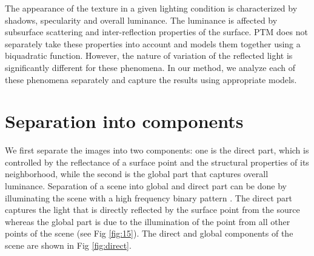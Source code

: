 The appearance of the texture in a given lighting condition is characterized by
shadows, specularity and overall luminance. The luminance is affected by
subsurface scattering and inter-reflection properties of the surface. PTM does
not separately take these properties into account and models them together using
a biquadratic function. However, the nature of variation of the reflected light
is significantly different for these phenomena.
In our method, we analyze each of these phenomena separately and capture the
results using appropriate models. 
\section{Separation into components}
We first separate the images into two components: one is the direct part, which is controlled by the reflectance of a
surface point and the structural properties of its neighborhood, while the
second is the global part that captures overall luminance. 
Separation of a scene into global and direct part can be done by illuminating the scene with a high
frequency binary pattern \cite{chap3-1}. The direct part captures the light that is
directly reflected by the surface point from the source whereas the global part
is due to the illumination of the point from all other points of the scene (see Fig \ref{fig:15}).
The direct and global components of the scene are shown in Fig \ref{fig:direct}.

